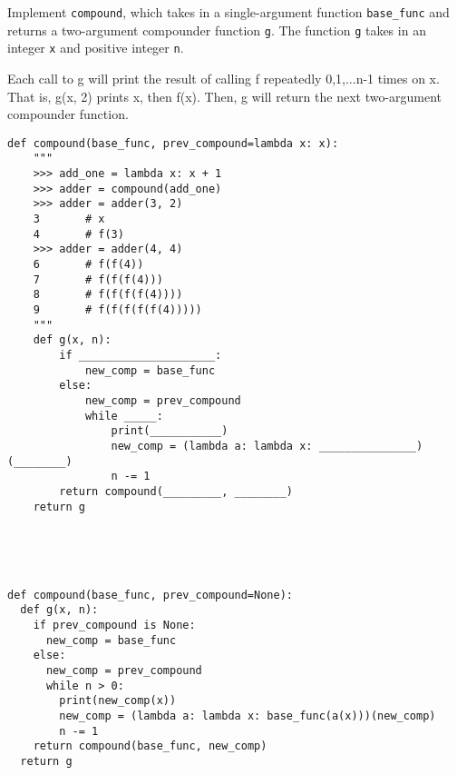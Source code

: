 \begin{blocksection}
\question Implement \lstinline$compound$, which takes in a single-argument function \lstinline$base_func$ and returns a two-argument compounder function \lstinline$g$. The function \lstinline$g$ takes in an integer \lstinline$x$ and positive integer \lstinline$n$.

Each call to g will print the result of calling f repeatedly 0,1,...n-1 times on x. That is, g(x, 2) prints x, then f(x). Then, g will return the next two-argument compounder function.

\begin{lstlisting}
def compound(base_func, prev_compound=lambda x: x):
	"""
	>>> add_one = lambda x: x + 1
	>>> adder = compound(add_one)
	>>> adder = adder(3, 2)
	3       # x
	4       # f(3)
	>>> adder = adder(4, 4)
	6       # f(f(4))
	7       # f(f(f(4)))
	8       # f(f(f(f(4))))
	9       # f(f(f(f(f(4)))))
	"""
	def g(x, n):
	    if _____________________:
			new_comp = base_func
		else:
			new_comp = prev_compound
			while _____:
	       		print(___________)
	        	new_comp = (lambda a: lambda x: _______________)(________)
	        	n -= 1
		return compound(_________, ________)
	return g





\end{lstlisting}

\begin{solution}[1in]
\begin{lstlisting}
def compound(base_func, prev_compound=None):
  def g(x, n):
    if prev_compound is None:
      new_comp = base_func
    else:
      new_comp = prev_compound
      while n > 0:
        print(new_comp(x))
        new_comp = (lambda a: lambda x: base_func(a(x)))(new_comp)
        n -= 1
    return compound(base_func, new_comp)
  return g

\end{lstlisting}
\end{solution}
\end{blocksection}